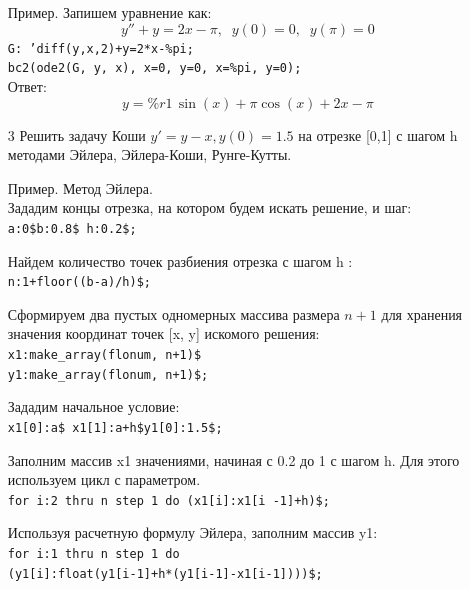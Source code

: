 \documentclass[article, bachelor, och, pract]{SCWorks}
\begin{document}
\begin{itemize}
Пример. Запишем уравнение как:
$$y''+y=2x-\pi, \;\; y(0)=0, \;\; y(\pi)=0$$
\texttt{G: 'diff(y,x,2)+y=2*x-\%pi;}\\
\texttt{bc2(ode2(G, y, x), x=0, y=0, x=\%pi, y=0);}\\
Ответ: \[y=\mathit{\%{}r1}\,\sin{(x)}+\ensuremath{\pi} \cos{(x)}+2x-\ensuremath{\pi} \]

\item[3] Решить задачу Коши \(y'=y-x, y(0)=1.5\) на отрезке [0,1] с шагом h методами Эйлера, Эйлера-Коши, Рунге-Кутты.

Пример. Метод Эйлера. \\
Зададим концы отрезка, на котором будем искать решение, и шаг:\\
\texttt{a:0\$b:0.8\$ h:0.2\$;}

Найдем количество точек разбиения отрезка с шагом h :\\
\texttt{n:1+floor((b-a)/h)\$;}

Сформируем два пустых одномерных массива размера \(n+1\) для хранения значения координат точек [x, y] искомого решения:\\
\texttt{x1:make\_array(flonum, n+1)\$}\\
\texttt{y1:make\_array(flonum, n+1)\$;}

Зададим начальное условие:\\
\texttt{x1[0]:a\$ x1[1]:a+h\$y1[0]:1.5\$;}

Заполним массив x1 значениями, начиная с 0.2 до 1 с шагом h.
Для этого используем цикл с параметром.\\
\texttt{for i:2 thru n step 1 do (x1[i]:x1[i -1]+h)\$;}

Используя расчетную формулу Эйлера, заполним массив y1:\\
\texttt{for i:1 thru n step 1 do\\
(y1[i]:float(y1[i-1]+h*(y1[i-1]-x1[i-1])))\$;}


\end{itemize}
\end{document}
